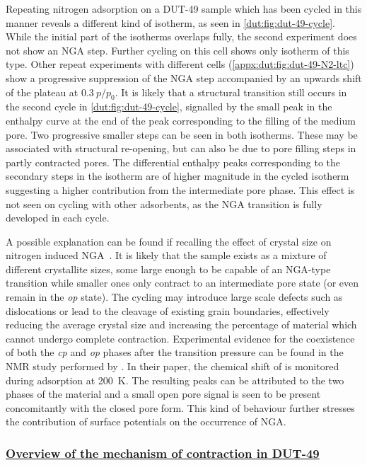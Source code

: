 Repeating nitrogen adsorption on a DUT-49 sample which has been
cycled in this manner reveals a different kind of isotherm, 
as seen in \autoref{dut:fig:dut-49-cycle}. While the initial 
part of the isotherms overlaps fully,
the second experiment does not show an NGA step. Further cycling 
on this cell shows only isotherm of this type.
Other repeat experiments with different cells
(\autoref{appx:dut:fig:dut-49-N2-ltc}) show a progressive 
suppression of the NGA step accompanied by an upwards shift
of the plateau at \(0.3~p/p_0\). It is likely that a structural 
transition still occurs in the second cycle in \autoref{dut:fig:dut-49-cycle},
signalled by the small peak in the enthalpy curve at the end of the 
peak corresponding to the filling of the medium pore.
Two progressive smaller steps can be seen in both isotherms. These
may be associated with structural re-opening, but can also be due to
pore filling steps in partly contracted pores. The differential enthalpy 
peaks corresponding to the secondary steps in the isotherm are 
of higher magnitude in the cycled isotherm suggesting a higher 
contribution from the intermediate pore phase.
This effect is not seen on cycling with other 
adsorbents, as the NGA transition is fully developed in each cycle. 

A possible explanation can be found if recalling the effect 
of crystal size on nitrogen induced 
NGA~\cite{krauseEffectCrystalliteSize2018}. It is likely 
that the sample exists as a mixture of different crystallite
sizes, some large enough to be capable of an NGA-type transition 
while smaller ones only contract to an intermediate pore state
(or even remain in the \textit{op} state).
The cycling may introduce large scale defects such as dislocations
or lead to the cleavage of existing grain boundaries, 
effectively reducing the average crystal size
and increasing the percentage of material which cannot undergo 
complete contraction.
Experimental evidence for the coexistence of both the \textit{cp} and 
\textit{op} phases after the transition pressure can be found in the 
 NMR study performed 
by \citet{schaberSituMonitoringUnique2017}. In their paper,
the chemical shift of  is monitored during
adsorption at \SI{200}{\kelvin}. The resulting peaks can be attributed
to the two phases of the material and a small
open pore signal is seen to be present concomitantly with the 
closed pore form.
This kind of behaviour further stresses the 
contribution of surface potentials on the occurrence of NGA.

\subsubsection{\underline{Overview of the mechanism of contraction in DUT-49}}

